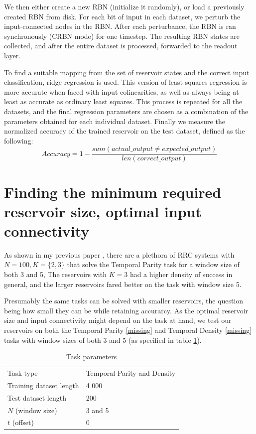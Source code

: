 We then either create a new RBN (initialize it randomly),
or load a previously created RBN from disk.
For each bit of input in each dataset,
we perturb the input-connected nodes in the RBN.
After each perturbance, the RBN is ran synchronously (CRBN mode) for one timestep.
The resulting RBN states are collected,
and after the entire dataset is processed,
forwarded to the readout layer.

To find a suitable mapping from the set of reservoir states and the correct input classification,
ridge regression \cite{hoerl1970ridge} is used.
This version of least squares regression is more accurate when faced with input colinearities, as well as always being at least as accurate as ordinary least squares.  
This process is repeated for all the datasets,
and the final regression parameters are chosen as a combination of the parameters obtained for each individual dataset.
Finally we measure the normalized accuracy of the trained reservoir on the test dataset,
defined as the following:
\begin{equation}
Accuracy = 1 - \dfrac{sum(actual\_output \neq expected\_output)}{len(correct\_output)}
\label{formula:accuracy}
\end{equation}

\section{Finding the minimum required reservoir size, optimal input connectivity}

As shown in my previous paper \cite{MyPreviousPaper},
there are a plethora of RRC systems with $N=100, K=\{2, 3\}$ that solve the Temporal Parity task for a window size of both 3 and 5,
The reservoirs with $K=3$ had a higher density of success in general,
and the larger reservoirs fared better on the task with window size 5.

Presumably the same tasks can be solved with smaller reservoirs,
the question being how small they can be while retaining accurarcy.
As the optimal reservoir size and input connectivity might depend on the task at hand,
we test our reservoirs on both the Temporal Parity \ref{missing} and Temporal Density \ref{missing}
tasks with window sizes of both 3 and 5 (as specified in table \ref{tab:tasks}).

\begin{table}[ht]
  \centering
  \caption{Task parameters}
  \label{tab:tasks}
  \begin{tabular}{ll}
    Task type               & Temporal Parity and Density \\
    Training dataset length & 4 000                       \\
    Test dataset length     & 200                         \\
    $N$ (window size)       & 3 and 5                     \\
    $t$ (offset)            & 0
  \end{tabular}
\end{table}


